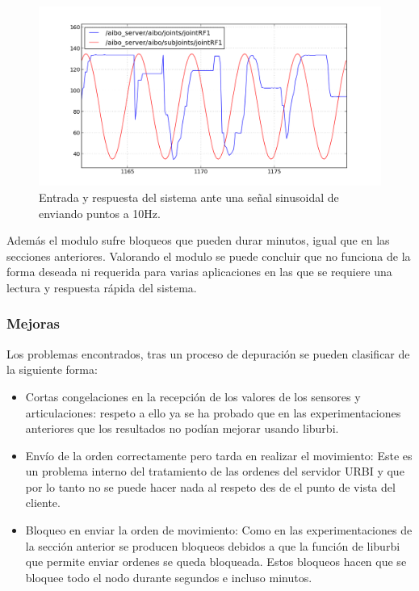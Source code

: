 \documentclass[12pt,a4paper,final,twoside]{article}
\begin{document}
   \begin{figure}[H]
	\centering
    \includegraphics[scale=0.66]{images/sinlegWR/10Ry10SAll.png}
 	\caption{Entrada y respuesta del sistema ante una señal sinusoidal de enviando puntos a 10Hz.}
  \label{fig:ASsin10Hz}
\end{figure}

Además el modulo sufre bloqueos que pueden durar minutos, igual que en las secciones anteriores.
Valorando el modulo se puede concluir que no funciona de la forma deseada ni requerida para varias aplicaciones en las que se requiere una lectura y respuesta rápida del sistema. 

\subsubsection{Mejoras}
Los problemas encontrados, tras un proceso de depuración se pueden clasificar de la siguiente forma:
\begin{itemize}
\item Cortas congelaciones en la recepción de los valores de los sensores y articulaciones: respeto a ello ya se ha probado que en las experimentaciones anteriores que los resultados no podían mejorar usando liburbi.
\item Envío de la orden correctamente pero tarda en realizar el movimiento: Este es un problema interno del tratamiento de las ordenes del servidor URBI y que por lo tanto no se puede hacer nada al respeto des de el punto de vista del cliente.
\item Bloqueo en enviar la orden de movimiento: Como en las experimentaciones de la sección anterior se producen bloqueos debidos a que la función de liburbi que permite enviar ordenes se queda bloqueada. Estos bloqueos hacen que se bloquee todo el nodo durante segundos e incluso minutos.
\end{itemize}
\end{document}

